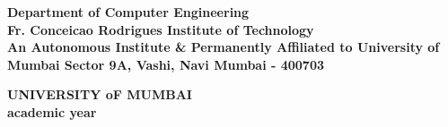 \begin{titlepage}
{{\bf Department of Computer Engineering \\
\vspace{0.2cm}
\bf {Fr. Conceicao Rodrigues Institute of Technology}\\
\bf{ An Autonomous Institute & Permanently Affiliated to University of Mumbai}
\bf Sector 9A, Vashi, Navi Mumbai - 400703} \\
{\centering
\hspace{.5cm}


{\centering
{\bf UNIVERSITY oF MUMBAI} \\
\vspace{0.2cm}}
\bf{ academic year} \\
}

}\end{titlepage} 